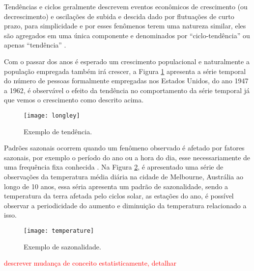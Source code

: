 Tendências e ciclos geralmente descrevem eventos econômicos de crescimento (ou
decrescimento) e oscilações de subida e descida dado por flutuações de curto
prazo, para simplicidade e por esses fenômenos terem uma natureza similar, eles
são agregados em uma única componente e denominados por ``ciclo-tendência'' ou
apenas ``tendência'' \cite{hyndman2018forecasting}.

Com o passar dos anos é esperado um crescimento populacional e naturalmente a
população empregada também irá crescer, a Figura \ref{fig:trend} apresenta a
série temporal do número de pessoas formalmente empregadas nos Estados Unidos,
do ano 1947 a 1962, é observável o efeito da tendência no comportamento da
série temporal já que vemos o crescimento como descrito acima.

\begin{figure}[ht]
    \centering
    \texttt{[image: longley]}
    \caption{Exemplo de tendência.}
    \label{fig:trend}
\end{figure}

Padrões sazonais ocorrem quando um fenômeno observado é afetado por fatores
sazonais, por exemplo o período do ano ou a hora do dia, esse necessariamente
de uma frequência fixa conhecida
\cite{hyndman2018forecasting,brockwell2016introduction}. Na Figura
\ref{fig:seasonality}, é apresentado uma série de observações da temperatura
média diária na cidade de Melbourne, Austrália ao longo de 10 anos, essa séria
apresenta um padrão de sazonalidade, sendo a temperatura da terra afetada pelo
ciclos solar, as estações do ano, é possível observar a periodicidade do
aumento e diminuição da temperatura relacionado a isso.

\begin{figure}[ht]
    \centering
    \texttt{[image: temperature]}
    \caption{Exemplo de sazonalidade.}
    \label{fig:seasonality}
\end{figure}



\textcolor{red}{descrever mudança de conceito estatisticamente, detalhar}




